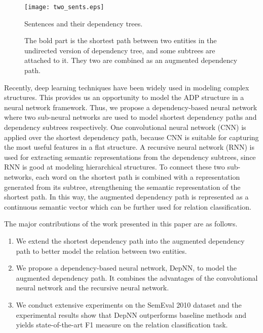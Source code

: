 \documentclass[11pt]{article}
\begin{document}
\begin{figure*}
\centering
\centering\texttt{[image: two\_sents.eps]}
\caption{Sentences and their dependency trees.}
\label{fig1}
\end{figure*}

\begin{figure*}
\centering
{}
\centering
{}
\caption{ The bold part is the shortest path between two entities in the undirected version of dependency tree, and some subtrees are attached to it. They two are combined as an augmented dependency path. }
\label{fig1}
\end{figure*}

Recently, deep learning techniques have been widely used in modeling complex structures. This provides us an opportunity to model the ADP structure in a neural network framework.
Thus, we propose a  dependency-based neural network where two sub-neural networks are used to model shortest dependency paths and dependency subtrees respectively.
One convolutional neural network (CNN) is applied over the shortest dependency path, because CNN is suitable  for capturing the most useful features in a flat structure.
A recursive neural network (RNN) is used for extracting semantic representations from the dependency subtrees, since RNN  is good at modeling hierarchical structures.
To connect these two sub-networks, each word on the shortest path is combined with a representation generated from its subtree, strengthening the semantic representation of the shortest path.
In this way, the augmented dependency path is represented as a continuous semantic vector which can be further used for relation classification.

The major contributions of the work presented in this paper are as follows.
\begin{enumerate}
\item We extend the shortest dependency path into the augmented dependency path to better model the relation between two entities.
\item We propose a dependency-based neural network, DepNN, to model the augmented dependency path. It combines the advantages of the convolutional neural network and the recursive neural network.
\item We conduct extensive experiments on the SemEval 2010 dataset and the experimental results show that DepNN outperforms baseline methods and yields state-of-the-art F1 measure on the relation classification task.
\end{enumerate}
\end{document}

